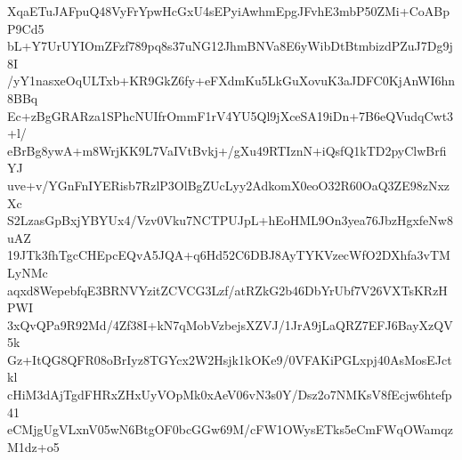 XqaETuJAFpuQ48VyFrYpwHcGxU4sEPyiAwhmEpgJFvhE3mbP50ZMi+CoABpP9Cd5
bL+Y7UrUYIOmZFzf789pq8s37uNG12JhmBNVa8E6yWibDtBtmbizdPZuJ7Dg9j8I
/yY1nasxeOqULTxb+KR9GkZ6fy+eFXdmKu5LkGuXovuK3aJDFC0KjAnWI6hn8BBq
Ec+zBgGRARza1SPhcNUIfrOmmF1rV4YU5Ql9jXceSA19iDn+7B6eQVudqCwt3+l/
eBrBg8ywA+m8WrjKK9L7VaIVtBvkj+/gXu49RTIznN+iQsfQ1kTD2pyClwBrfiYJ
uve+v/YGnFnIYERisb7RzlP3OlBgZUcLyy2AdkomX0eoO32R60OaQ3ZE98zNxzXc
S2LzasGpBxjYBYUx4/Vzv0Vku7NCTPUJpL+hEoHML9On3yea76JbzHgxfeNw8uAZ
19JTk3fhTgcCHEpcEQvA5JQA+q6Hd52C6DBJ8AyTYKVzecWfO2DXhfa3vTMLyNMc
aqxd8WepebfqE3BRNVYzitZCVCG3Lzf/atRZkG2b46DbYrUbf7V26VXTsKRzHPWI
3xQvQPa9R92Md/4Zf38I+kN7qMobVzbejsXZVJ/1JrA9jLaQRZ7EFJ6BayXzQV5k
Gz+ItQG8QFR08oBrIyz8TGYcx2W2Hsjk1kOKe9/0VFAKiPGLxpj40AsMosEJctkl
cHiM3dAjTgdFHRxZHxUyVOpMk0xAeV06vN3s0Y/Dsz2o7NMKsV8fEcjw6htefp41
eCMjgUgVLxnV05wN6BtgOF0bcGGw69M/cFW1OWysETks5eCmFWqOWamqzM1dz+o5
